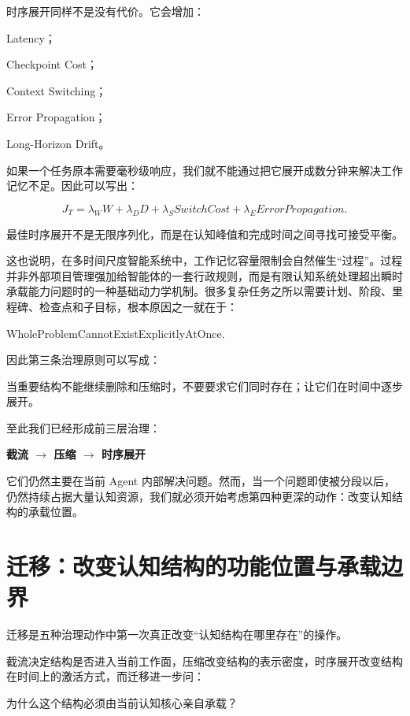 时序展开同样不是没有代价。它会增加：

Latency；

Checkpoint Cost；

Context Switching；

Error Propagation；

Long-Horizon Drift。

如果一个任务原本需要毫秒级响应，我们就不能通过把它展开成数分钟来解决工作记忆不足。因此可以写出：

\[
J_T
=
\lambda_W W
+
\lambda_D D
+
\lambda_S SwitchCost
+
\lambda_E ErrorPropagation.
\]

最佳时序展开不是无限序列化，而是在认知峰值和完成时间之间寻找可接受平衡。

这也说明，在多时间尺度智能系统中，工作记忆容量限制会自然催生“过程”。过程并非外部项目管理强加给智能体的一套行政规则，而是有限认知系统处理超出瞬时承载能力问题时的一种基础动力学机制。很多复杂任务之所以需要计划、阶段、里程碑、检查点和子目标，根本原因之一就在于：

\begin{statementbox}
WholeProblemCannotExistExplicitlyAtOnce.
\end{statementbox}

因此第三条治理原则可以写成：

\begin{proposition*}
当重要结构不能继续删除和压缩时，不要要求它们同时存在；让它们在时间中逐步展开。
\end{proposition*}

至此我们已经形成前三层治理：

\begin{statementbox}
\centering\bfseries
截流
$\longrightarrow$
压缩
$\longrightarrow$
时序展开
\end{statementbox}

它们仍然主要在当前 Agent 内部解决问题。然而，当一个问题即使被分段以后，仍然持续占据大量认知资源，我们就必须开始考虑第四种更深的动作：改变认知结构的承载位置。

\section{迁移：改变认知结构的功能位置与承载边界}

迁移是五种治理动作中第一次真正改变“认知结构在哪里存在”的操作。

截流决定结构是否进入当前工作面，压缩改变结构的表示密度，时序展开改变结构在时间上的激活方式，而迁移进一步问：

\begin{statementbox}
为什么这个结构必须由当前认知核心亲自承载？
\end{statementbox}

